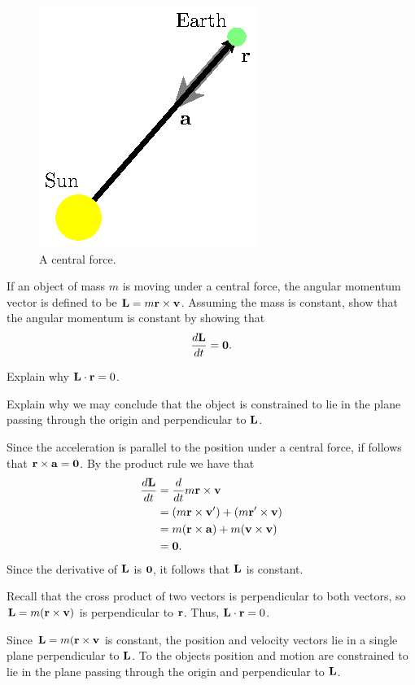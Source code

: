 \begin{exercises}
\begin{figure}[ht]
  \begin{center}
    \includegraphics{figures/fig_9_7_sun.eps}
    \caption{A central force.}
    \label{F:9.7.sun}
  \end{center}
\end{figure}

\ba
\item If an object of mass $m$ is moving under a central force, 
  the angular momentum vector is defined to be $\mathbf{L}=m\mathbf{r}\times\mathbf{v}$.
  Assuming the mass is constant, show that the angular momentum is
  constant by showing that
  $$
  \frac{d\mathbf{L}}{dt} = \mathbf{0}.
  $$

\item Explain why $\mathbf{L}\cdot\mathbf{r} = 0$.

\item Explain why we may conclude that the object is constrained to
  lie in the plane passing through the origin and perpendicular to
  $\mathbf{L}$.

\ea

\begin{exerciseSolution}
\ba
\item Since the acceleration is parallel to the position under a central force, if follows that $\mathbf{r} \times \mathbf{a} = \mathbf{0}$. By the product rule we have that 
\begin{align*}
\frac{d\mathbf{L}}{dt} &= \frac{d}{dt} m\mathbf{r}\times\mathbf{v} \\
	&= (m\mathbf{r} \times \mathbf{v}') + (m\mathbf{r}' \times \mathbf{v})  \\
	&= m(\mathbf{r} \times \mathbf{a}) + m(\mathbf{v} \times \mathbf{v}) \\
	&= \mathbf{0}.
\end{align*}
Since the derivative of $\mathbf{L}$ is $\mathbf{0}$, it follows that $\mathbf{L}$ is constant. 
  

\item Recall that the cross product of two vectors is perpendicular to both vectors, so $\mathbf{L} = m(\mathbf{r}\times\mathbf{v})$ is perpendicular to $\mathbf{r}$. Thus, $\mathbf{L}\cdot\mathbf{r} = 0$.

\item Since $\mathbf{L} = m(\mathbf{r} \times \mathbf{v}$ is constant, the position and velocity vectors lie in a single plane perpendicular to $\mathbf{L}$. To the objects position and motion are constrained to lie in the plane passing through the origin and perpendicular to $\mathbf{L}$.

\ea
\end{exerciseSolution}


\end{exercises}
\afterexercises
